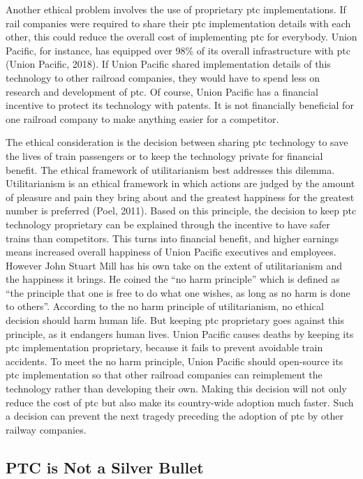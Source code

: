 \documentclass[11pt, titlepage]{article}
\begin{document}
Another ethical problem involves the use of proprietary \gls{ptc} implementations.
If rail companies were required to share their \gls{ptc} implementation details with
each other, this could reduce the overall cost of implementing \gls{ptc} for
everybody. Union Pacific, for instance, has equipped over 98\% of its overall
infrastructure with \gls{ptc} (Union Pacific, 2018). If Union Pacific shared
implementation details of this technology to other railroad companies, they would
have to spend less on research and development of \gls{ptc}.  Of course, Union
Pacific has a financial incentive to protect its technology with patents. It is not
financially beneficial for one railroad company to make anything easier for a
competitor.

The ethical consideration is the decision between sharing \gls{ptc} technology to
save the lives of train passengers or to keep the technology private for financial
benefit. The ethical framework of utilitarianism best addresses this dilemma.
Utilitarianism is an ethical framework in which actions are judged by the amount of
pleasure and pain they bring about and the greatest happiness for the greatest
number is preferred (Poel, 2011). Based on this principle, the decision to keep
\gls{ptc} technology proprietary can be explained through the incentive to have
safer trains than competitors. This turns into financial benefit, and higher
earnings means increased overall happiness of Union Pacific executives and
employees. However John Stuart Mill has his own take on the extent of utilitarianism
and the happiness it brings. He coined the ``no harm principle'' which is defined as
``the principle that one is free to do what one wishes, as long as no harm is done
to others''. According to the no harm principle of utilitarianism, no ethical
decision should harm human life. But keeping \gls{ptc} proprietary goes against this
principle, as it endangers human lives. Union Pacific causes deaths by keeping its
\gls{ptc} implementation proprietary, because it fails to prevent avoidable train
accidents. To meet the no harm principle, Union Pacific should open-source its
\gls{ptc} implementation so that other railroad companies can reimplement the
technology rather than developing their own. Making this decision will not only
reduce the cost of \gls{ptc} but also make its country-wide adoption much faster.
Such a decision can prevent the next tragedy preceding the adoption of \gls{ptc} by
other railway companies.

\subsection{PTC is Not a Silver Bullet}
\end{document}
